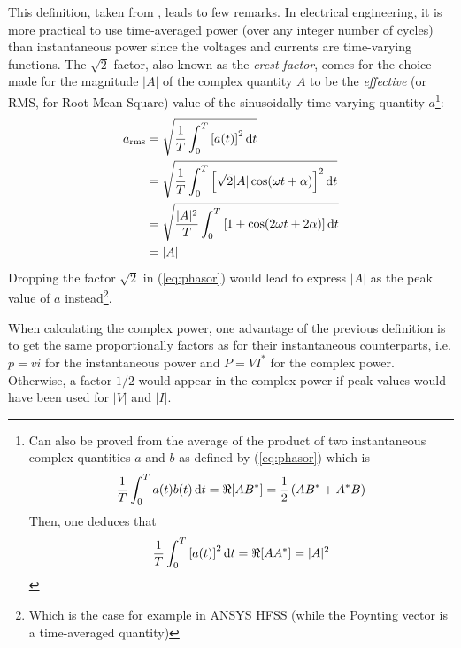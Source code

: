 This definition, taken from \parencite{Harrington2001}, leads to few remarks. In electrical engineering, it is more practical to use time-averaged power (over any integer number of cycles) than instantaneous power since the voltages and currents are time-varying functions. The $\sqrt{2}$ factor, also known as the \emph{crest factor}, comes for the choice made for the magnitude $|A|$ of the complex quantity $A$ to be the \emph{effective} (or RMS, for Root-Mean-Square) value of the sinusoidally time varying quantity $a$\footnote{Can also be proved from the average of the product of two instantaneous complex quantities $a$ and $b$ as defined by (\ref{eq:phasor}) which is  
	$$ 
	\frac{1}{T}  \int_0^T a(t) b(t)\mathop{}\!\mathrm{d} t = \Re[AB^*] = \frac{1}{2}\left(AB^* + A^* B \right)
	$$
	Then, one deduces that 
	$$
	\frac{1}{T}  \int_0^T \left[a(t)\right]^2 \mathop{}\!\mathrm{d} t = \Re[AA^*] = |A|^2
	$$}: 
\begin{subequations}
	\begin{align}
	a_{\mathrm{rms}} 
	&= \sqrt{\frac{1}{T} \int_0^T \left[a(t) \right]^2 \mathop{}\!\mathrm{d} t}  \nonumber \\
	&= \sqrt{\frac{1}{T} \int_0^T  \left[\sqrt{2} |A| \cos (\omega t + \alpha) \right]^2 \mathop{}\!\mathrm{d} t} \nonumber \\
	&= \sqrt{\frac{|A|^2}{T} \int_0^T  \left[ 1+\cos (2\omega t + 2\alpha) \right] \mathop{}\!\mathrm{d} t} \nonumber \\
	&= |A| \nonumber
	\end{align}
\end{subequations}
Dropping the factor $\sqrt{2}$ in (\ref{eq:phasor}) would lead to express $|A|$ as the peak value of $a$ instead\footnote{Which is the case for example in ANSYS HFSS (while the Poynting vector is a time-averaged quantity)}. 

When calculating the complex power, one advantage of the previous definition is to get the same proportionally factors as for their instantaneous counterparts, i.e. $p=v i$ for the instantaneous power and $P=VI^*$ for the complex power. Otherwise, a factor $1/2$ would appear in the complex power if peak values would have been used for $|V|$ and $|I|$.

